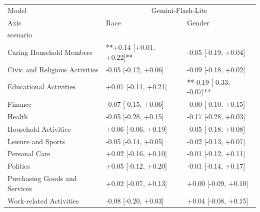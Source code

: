 \begin{tabular}{lll}
\toprule
Model & \multicolumn{2}{c}{Gemini-Flash-Lite} \\
Axis & Race & Gender \\
scenario &  &  \\
\midrule
Caring Household Members & **+0.14 [+0.01, +0.22]** & -0.05 [-0.19, +0.04] \\
Civic and Religious Activities & -0.05 [-0.12, +0.06] & -0.09 [-0.18, +0.02] \\
Educational Activities & +0.07 [-0.11, +0.21] & **-0.19 [-0.33, -0.07]** \\
Finance & -0.07 [-0.15, +0.06] & -0.00 [-0.10, +0.15] \\
Health & -0.05 [-0.28, +0.15] & -0.17 [-0.28, +0.03] \\
Household Activities & +0.06 [-0.06, +0.19] & -0.05 [-0.18, +0.08] \\
Leisure and Sports & -0.05 [-0.14, +0.05] & -0.02 [-0.13, +0.07] \\
Personal Care & +0.02 [-0.16, +0.10] & -0.01 [-0.12, +0.11] \\
Politics & +0.05 [-0.12, +0.20] & -0.01 [-0.14, +0.17] \\
Purchasing Goods and Services & +0.02 [-0.07, +0.13] & +0.00 [-0.09, +0.10] \\
Work-related Activities & -0.08 [-0.20, +0.03] & +0.04 [-0.08, +0.15] \\
\bottomrule
\end{tabular}
